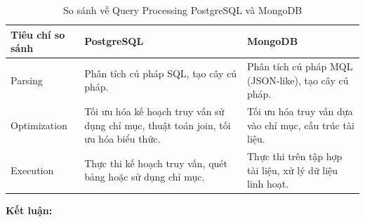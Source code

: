 \begin{table}[H]
    \centering
    \begin{tabular}{|L{3.2cm}|L{5cm}|L{5cm}|} \hline 
         \textbf{Tiêu chí so sánh }&  \textbf{PostgreSQL}&  \textbf{MongoDB}\\ \hline 
         Parsing &  Phân tích cú pháp SQL, tạo cây cú pháp. & Phân tích cú pháp MQL (JSON-like), tạo cây cú pháp.\\ \hline 
         Optimization &  Tối ưu hóa kế hoạch truy vấn sử dụng chỉ mục, thuật toán join, tối ưu hóa biểu thức. & Tối ưu hóa truy vấn dựa vào chỉ mục, cấu trúc tài liệu.\\ \hline 
         Execution &  Thực thi kế hoạch truy vấn, quét bảng hoặc sử dụng chỉ mục. &  Thực thi trên tập hợp tài liệu, xử lý dữ liệu linh hoạt.\\ \hline
    \end{tabular}
    \caption{So sánh về Query Processing PostgreSQL và MongoDB}
    \label{tab:query_processing}
\end{table}
\indent \textbf{Kết luận:}
\newpage
